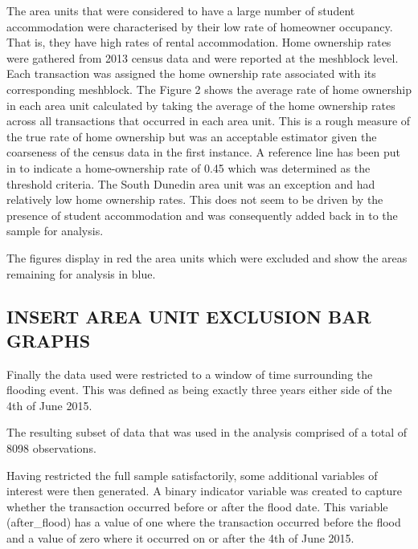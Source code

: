 \documentclass[]{article}
\begin{document}
The area units that were considered to have a large number of student
accommodation were characterised by their low rate of homeowner
occupancy. That is, they have high rates of rental accommodation. Home
ownership rates were gathered from 2013 census data and were reported at
the meshblock level. Each transaction was assigned the home ownership
rate associated with its corresponding meshblock. The Figure 2 shows the
average rate of home ownership in each area unit calculated by taking
the average of the home ownership rates across all transactions that
occurred in each area unit. This is a rough measure of the true rate of
home ownership but was an acceptable estimator given the coarseness of
the census data in the first instance. A reference line has been put in
to indicate a home-ownership rate of 0.45 which was determined as the
threshold criteria. The South Dunedin area unit was an exception and had
relatively low home ownership rates. This does not seem to be driven by
the presence of student accommodation and was consequently added back in
to the sample for analysis.

The figures display in red the area units which were excluded and show
the areas remaining for analysis in blue.

\subsection{INSERT AREA UNIT EXCLUSION BAR
GRAPHS}\label{insert-area-unit-exclusion-bar-graphs}

Finally the data used were restricted to a window of time surrounding
the flooding event. This was defined as being exactly three years either
side of the 4th of June 2015.

The resulting subset of data that was used in the analysis comprised of
a total of 8098 observations.

Having restricted the full sample satisfactorily, some additional
variables of interest were then generated. A binary indicator variable
was created to capture whether the transaction occurred before or after
the flood date. This variable (after\_flood) has a value of one where
the transaction occurred before the flood and a value of zero where it
occurred on or after the 4th of June 2015.
\end{document}

